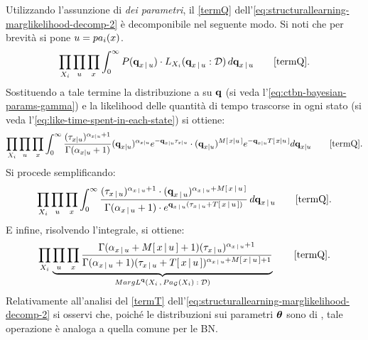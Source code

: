 Utilizzando l'assunzione di \emph{ dei parametri}, il \autoref{termQ} dell'\autoref{eq:structurallearning-marglikelihood-decomp-2} è decomponibile nel seguente modo. Si noti che per brevità si pone $\mathnormal{u}=pa_i(\mathnormal{x})$.
\[
\prod_{\setel{X}_i} \prod_{\setel{u}} \prod_{\setel{x}} \int_0^\infty P(\param{q}_{\setel{x}\,\arrowvert\,\setel{u}}) \cdot L_{\setel{X}_i}(\param{q}_{\setel{x}\,\arrowvert\,\setel{u}}:\conceptsym{D}) \, d\param{q}_{\setel{x}\,\arrowvert\,\setel{u}} \tag*{\ref{termQ}} \text{.}
\]
Sostituendo a tale termine la distribuzione a  su $\boldsymbol{\textbf{\text{q}}}$ (si veda l'\autoref{eq:ctbn-bayesian-params-gamma}) e la likelihood delle quantità di tempo trascorse in ogni stato (si veda l'\autoref{eq:like-time-spent-in-each-state}) si ottiene:
\footnotesize
\[
\prod_{\setel{X}_i} \prod_{\setel{u}} \prod_{\setel{x}} \int_0^\infty \frac{(\tau_{\setel{x}\arrowvert\setel{u}})^{\alpha_{\setel{x}\arrowvert\setel{u}}+1}}{\Gamma({\alpha_{\setel{x}\arrowvert\setel{u}}+1})} (\param{q}_{\setel{x}\arrowvert\setel{u}})^{\alpha_{\setel{x}\arrowvert\setel{u}}} e^{-\param{q}_{\setel{x}\arrowvert\setel{u}}\tau_{\setel{x}\arrowvert\setel{u}}} \cdot (\param{q}_{x\arrowvert\setel{u}})^{\mstat{x\arrowvert\setel{u}}} e^{-\param{q}_{\setel{x}\arrowvert\setel{u}}\tstat{\setel{x}\arrowvert\setel{u}}} d\param{q}_{\setel{x}\arrowvert\setel{u}} \tag*{\ref{termQ}} \text{\normalsize .}
\]
\normalsize
Si procede semplificando:
\[
\prod_{\setel{X}_i} \prod_{\setel{u}} \prod_{\setel{x}} \int_0^\infty \frac{(\tau_{\setel{x}\,\arrowvert\,\setel{u}})^{\alpha_{\setel{x}\,\arrowvert\,\setel{u}}+1} \cdot (\param{q}_{\setel{x}\,\arrowvert\,\setel{u}})^{\alpha_{\setel{x}\,\arrowvert\,\setel{u}}+\mstat{x\,\arrowvert\,\setel{u}}}}{\Gamma({\alpha_{\setel{x}\,\arrowvert\,\setel{u}}+1}) \cdot e^{\param{q}_{\setel{x}\,\arrowvert\,\setel{u}}(\tau_{\setel{x}\,\arrowvert\,\setel{u}}+\tstat{\setel{x}\,\arrowvert\,\setel{u}})}}  \, d\param{q}_{\setel{x}\,\arrowvert\,\setel{u}} \tag*{\ref{termQ}} \text{.}
\]
E infine, risolvendo l'integrale, si ottiene:
\[
\prod_{\setel{X}_i} \underbrace{\prod_{\setel{u}} \prod_{\setel{x}} \frac{\Gamma(\alpha_{\setel{x}\,\arrowvert\,\setel{u}}+\mstat{x\,\arrowvert\,\setel{u}}+1)(\tau_{\setel{x}\,\arrowvert\,\setel{u}})^{\alpha_{\setel{x}\,\arrowvert\,\setel{u}}+1}}{\Gamma(\alpha_{\setel{x}\,\arrowvert\,\setel{u}}+1)(\tau_{\setel{x}\,\arrowvert\,\setel{u}}+\tstat{\setel{x}\,\arrowvert\,\setel{u}})^{\alpha_{\setel{x}\,\arrowvert\,\setel{u}}+\mstat{x\,\arrowvert\,\setel{u}}+1}}}_\text{$MargL^{\param{q}}(\setel{X}_i\,,Pa_{\conceptsym{G}}(\setel{X}_i):\conceptsym{D})$} \tag*{\ref{termQ}} \text{.}
\]
Relativamente all'analisi del \autoref{termT} dell'\autoref{eq:structurallearning-marglikelihood-decomp-2} si osservi che, poiché le distribuzioni sui parametri $\boldsymbol{\textbf{\text{$\theta$}}}$ sono di \emph{}, tale operazione è analoga a quella comune per le \acl{BN}.

